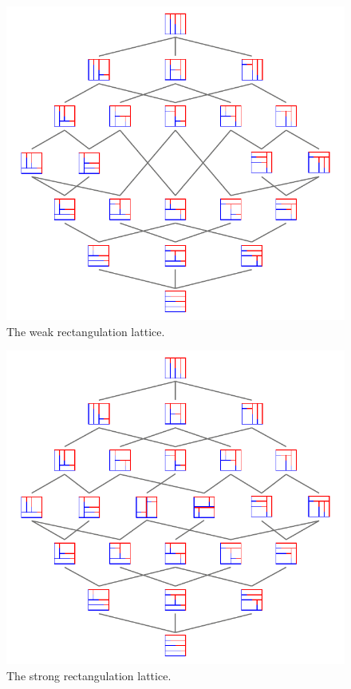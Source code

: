 \documentclass{amsart}
\theoremstyle{definition}
\begin{document}
\begin{figure}
	\centerline{\includegraphics[scale=.9]{weakRectangulationLattice}}
	\caption{The weak rectangulation lattice.}
	\label{fig:weakRectangulationLattice}
\end{figure}

\begin{figure}
	\centerline{\includegraphics[scale=.9]{strongRectangulationLattice}}
	\caption{The strong rectangulation lattice.}
	\label{fig:strongRectangulationLattice}
\end{figure}
\end{document}
